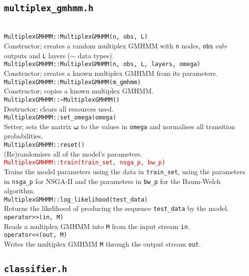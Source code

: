 \documentclass[12pt]{article}
\newcommand{\fundef}[1]{\\\indent\indent\texttt{#1}\\}
\begin{document}
	\subsection{\tt multiplex\_gmhmm.h}
	\hfill\vspace*{-10pt}\fundef{MultiplexGMHMM::MultiplexGMHMM(n, obs, L)}
	Constructor; creates a random multiplex GMHMM with {\tt n} nodes, {\tt obs} sub-outputs and {\tt L} layers ($\sim$ data types).
	\fundef{MultiplexGMHMM::MultiplexGMHMM(n, obs, L, layers, omega)}
	Constructor; creates a known multiplex GMHMM from its parameters.
	\fundef{MultiplexGMHMM::MultiplexGMHMM(m\_gmhmm)}
	Constructor; copies a known multiplex GMHMM.	
	\fundef{MultiplexGMHMM::\textasciitilde MultiplexGMHMM()}
	Destructor; clears all resources used.
	\fundef{MultiplexGMHMM::set\_omega(omega)}
	Setter; sets the matrix $\boldsymbol\omega$ to the values in {\tt omega} and normalises all transition probabilities.
	\fundef{MultiplexGMHMM::reset()}
	(Re)randomises all of the model's parameters.
	\textcolor{red}{\fundef{MultiplexGMHMM::train(train\_set, nsga\_p, bw\_p)}}
	Trains the model parameters using the data in {\tt train\_set}, using the parameters in {\tt nsga\_p} for NSGA-II and the parameters in {\tt bw\_p} for the Baum-Welch algorithm.
	\fundef{MultiplexGMHMM::log\_likelihood(test\_data)}
	Returns the likelihood of producing the sequence {\tt test\_data} by the model.
	\fundef{operator>\/>(in, M)}
	Reads a multiplex GMHMM into {\tt M} from the input stream {\tt in}.
	\fundef{operator<\/<(out, M)}
	Writes the multiplex GMHMM {\tt M} through the output stream {\tt out}.
		
	\subsection{\tt classifier.h}\label{sec:classhdr}
	
\end{document}
